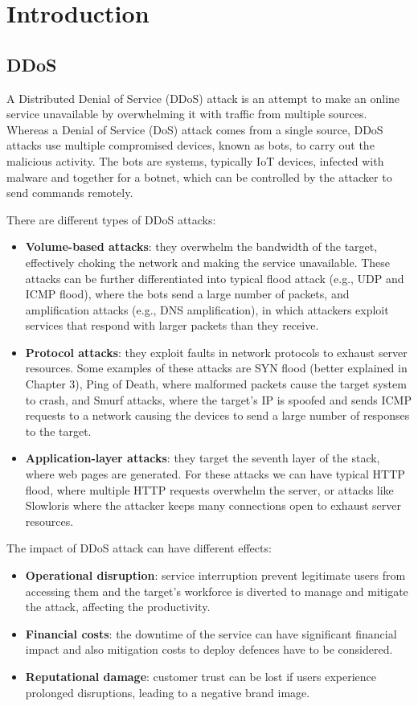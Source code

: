 \chapter{Introduction}
\label{chapter:introduction}

\section{DDoS}

A Distributed Denial of Service (DDoS) attack is an attempt to make an online service unavailable by overwhelming it with traffic from multiple sources. Whereas a Denial of Service (DoS) attack comes from a single source, DDoS attacks use multiple compromised devices, known as bots, to carry out the malicious activity. The bots are systems, typically IoT devices, infected with malware and together for a botnet, which can be controlled by the attacker to send commands remotely.

There are different types of DDoS attacks:
\begin{itemize}
	\item \textbf{Volume-based attacks}: they overwhelm the bandwidth of the target, effectively choking the network and making the service unavailable. These attacks can be further differentiated into typical flood attack (e.g., UDP and ICMP flood), where the bots send a large number of packets, and amplification attacks (e.g., DNS amplification), in which attackers exploit services that respond with larger packets than they receive.
	\item \textbf{Protocol attacks}: they exploit faults in network protocols to exhaust server resources. Some examples of these attacks are SYN flood (better explained in Chapter 3), Ping of Death, where malformed packets cause the target system to crash, and Smurf attacks, where the target's IP is spoofed and sends ICMP requests to a network causing the devices to send a large number of responses to the target.
	\item \textbf{Application-layer attacks}: they target the seventh layer of the stack, where web pages are generated. For these attacks we can have typical HTTP flood, where multiple HTTP requests overwhelm the server, or attacks like Slowloris where the attacker keeps many connections open to exhaust server resources.
\end{itemize}

The impact of DDoS attack can have different effects:
\begin{itemize}
	\item \textbf{Operational disruption}: service interruption prevent legitimate users from accessing them and the target's workforce is diverted to manage and mitigate the attack, affecting the productivity.
	\item \textbf{Financial costs}: the downtime of the service can have significant financial impact and also mitigation costs to deploy defences have to be considered.
	\item \textbf{Reputational damage}: customer trust can be lost if users experience prolonged disruptions, leading to a negative brand image.
\end{itemize}

